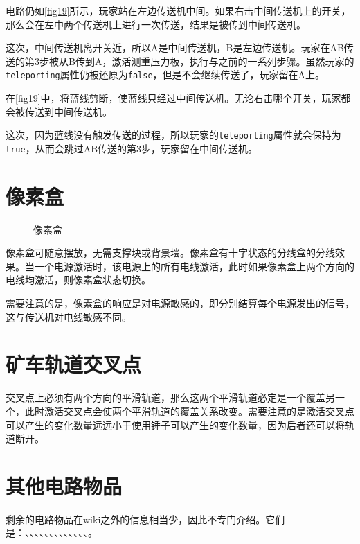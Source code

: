 \begin{example}{}{}
  电路仍如\autoref{fig19}所示，玩家站在左边传送机中间。如果右击中间传送机上的开关，那么会在左中两个传送机上进行一次传送，结果是被传到中间传送机。

  这次，中间传送机离开关近，所以A是中间传送机，B是左边传送机。玩家在AB传送的第3步被从B传到A，激活测重压力板，执行与之前的一系列步骤。虽然玩家的\lstinline{teleporting}属性仍被还原为\lstinline{false}，但是不会继续传送了，玩家留在A上。
\end{example}

\begin{example}{}{}
  在\autoref{fig19}中，将蓝线剪断，使蓝线只经过中间传送机。无论右击哪个开关，玩家都会被传送到中间传送机。

  这次，因为蓝线没有触发传送的过程，所以玩家的\lstinline{teleporting}属性就会保持为\lstinline{true}，从而会跳过AB传送的第3步，玩家留在中间传送机。
\end{example}

\section{像素盒}\label{sec21}
\begin{figure}[!ht]
  \centering
  \caption{像素盒}
\end{figure}
像素盒可随意摆放，无需支撑块或背景墙。像素盒有十字状态的分线盒的分线效果。当一个电源激活时，该电源上的所有电线激活，此时如果像素盒上两个方向的电线均激活，则像素盒状态切换。

需要注意的是，像素盒的响应是对电源敏感的，即分别结算每个电源发出的信号，这与传送机对电线敏感不同。

\section{矿车轨道交叉点}
交叉点上必须有两个方向的平滑轨道，那么这两个平滑轨道必定是一个覆盖另一个，此时激活交叉点会使两个平滑轨道的覆盖关系改变。需要注意的是激活交叉点可以产生的变化数量远远小于使用锤子可以产生的变化数量，因为后者还可以将轨道断开。

\section{其他电路物品}

剩余的电路物品在wiki之外的信息相当少，因此不专门介绍。它们是：、、、、、、、、、、、、\wiki{\GolfCup}、\wiki{\Grate}。
